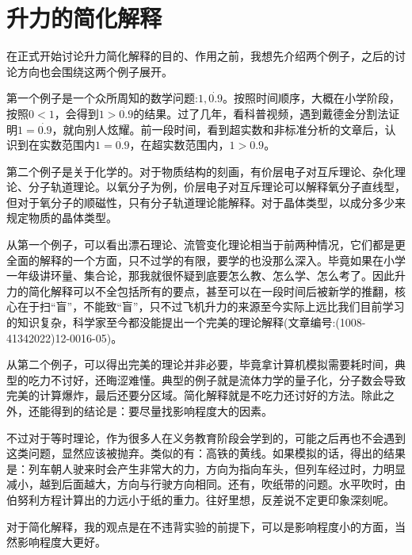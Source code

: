 \documentclass{ctexart}%
\begin{document}
\part*{升力的简化解释}
在正式开始讨论升力简化解释的目的、作用之前，我想先介绍两个例子，之后的讨论方向也会围绕这两个例子展开。\par
第一个例子是一个众所周知的数学问题:$1,\dot{0.9}$。按照时间顺序，大概在小学阶段，按照$0<1$，会得到$1>\dot{0.9}$的结果。过了几年，看科普视频，遇到戴德金分割法证明$1=\dot{0.9}$，就向别人炫耀。前一段时间，看到超实数和非标准分析的文章后，认识到在实数范围内$1=\dot{0.9}$，在超实数范围内，$1>\dot{0.9}$。\par
第二个例子是关于化学的。对于物质结构的刻画，有价层电子对互斥理论、杂化理论、分子轨道理论。以氧分子为例，价层电子对互斥理论可以解释氧分子直线型，但对于氧分子的顺磁性，只有分子轨道理论能解释。对于晶体类型，以成分多少来规定物质的晶体类型。\par
从第一个例子，可以看出漂石理论、流管变化理论相当于前两种情况，它们都是更全面的解释的一个方面，只不过学的有限，要学的也没那么深入。毕竟如果在小学一年级讲环量、集合论，那我就很怀疑到底要怎么教、怎么学、怎么考了。因此升力的简化解释可以不全包括所有的要点，甚至可以在一段时间后被新学的推翻，核心在于扫“盲”，不能致“盲”，只不过飞机升力的来源至今实际上远比我们目前学习的知识复杂，科学家至今都没能提出一个完美的理论解释(文章编号:(1008-41342022)12-0016-05)。\par
从第二个例子，可以得出完美的理论并非必要，毕竟拿计算机模拟需要耗时间，典型的吃力不讨好，还晦涩难懂。典型的例子就是流体力学的量子化，分子数会导致完美的计算爆炸，最后还要分区域。简化解释就是不吃力还讨好的方法。除此之外，还能得到的结论是：要尽量找影响程度大的因素。\par
不过对于等时理论，作为很多人在义务教育阶段会学到的，可能之后再也不会遇到这类问题，显然应该被抛弃。类似的有：高铁的黄线。如果模拟的话，得出的结果是：列车朝人驶来时会产生非常大的力，方向为指向车头，但列车经过时，力明显减小，越到后面越大，方向与行驶方向相同。还有，吹纸带的问题。水平吹时，由伯努利方程计算出的力远小于纸的重力。往好里想，反差说不定更印象深刻呢。\par
对于简化解释，我的观点是在不违背实验的前提下，可以是影响程度小的方面，当然影响程度大更好。
\end{document}
